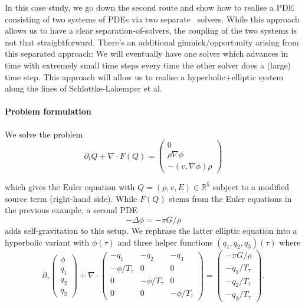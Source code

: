 In this case study, we go down the second route and show how to realise a PDE 
consisting of two systems of PDEs via two separate \ExaHyPE\ solvers.
While this approach allows us to have a clear separation-of-solvers, the coupling
of the two systems is not that straightforward.
There's an additional gimnick/opportunity arising from this separated approach:
We will eventually have one solver which advances in time with extremely small time
steps every time the other solver does a (large) time step.
This approach will allow us to realise a hyperbolic+elliptic system along the lines
of Schlottke-Lakemper et al. 

\paragraph{Problem formulation}
%
We solve the problem
\begin{equation}
 \partial _t Q + \nabla \cdot F(Q) = \left(
  \begin{array}{c}
  0 \\
  \rho \nabla \phi \\
  - (v, \nabla \phi) \rho
  \end{array} 
 \right)
 \label{equation:exahype:case-study:self-gravitation}
\end{equation}

\noindent
which gives the Euler equation with $Q = (\rho, v, E) \in \mathbb{R}^5$ subject to 
a modified source term (right-hand side).
While $F(Q)$ stems from the Euler equations in the previous example, a second PDE
\[
- \Delta \phi = -\pi G/\rho
\]
adds self-gravitation to this setup. We rephrase the latter elliptic equation into
a hyperbolic variant with $\phi (\tau)$ and three helper functions $(q_1,q_2,q_3)(\tau)$ where
\begin{equation}
 \partial _{\tau} 
 \left(
  \begin{array}{c}
   \phi \\ q_1 \\ q_2 \\ q_3
  \end{array} 
 \right)
 + \nabla \cdot
 \left(
  \begin{array}{ccc}
   -q_1 & -q_2 & -q_3 \\
   -\phi/T_\tau & 0 & 0 \\
   0 & -\phi/T_\tau & 0 \\
   0 & 0 & -\phi/T_\tau 
  \end{array} 
 \right)
 = 
  \left(
  \begin{array}{c}
   -\pi G/\rho \\ 
   -q_1/T_\tau \\
   -q_2/T_\tau \\
   -q_3/T_\tau 
  \end{array} 
 \right).
 \label{equation:exahype:case-study:elliptic-hyperbolic-constraint}
\end{equation}

